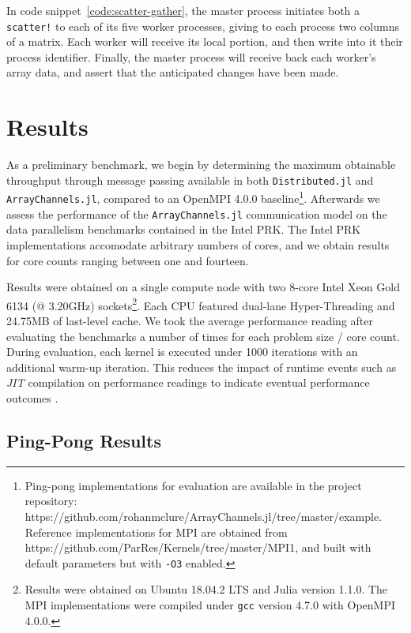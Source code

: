 \documentclass{juliacon}
\begin{document}
In code snippet~\ref{code:scatter-gather}, the master process initiates both a \texttt{scatter!} to each of its five worker processes, giving to each process two columns of a matrix. Each worker will receive its local portion, and then write into it their process identifier. Finally, the master process will receive back each worker's array data, and assert that the anticipated changes have been made.


\section{Results}
\label{sec:results}

As a preliminary benchmark, we begin by determining the maximum
obtainable throughput through message passing available in both
\texttt{Distributed.jl} and \texttt{ArrayChannels.jl}, compared to an
OpenMPI 4.0.0 baseline\footnote{Ping-pong implementations for evaluation
	are available in the project repository:
	https://github.com/rohanmclure/ArrayChannels.jl/tree/master/example.
	Reference implementations for MPI are obtained from
	https://github.com/ParRes/Kernels/tree/master/MPI1, and built with
	default parameters but with \texttt{-O3} enabled.}. Afterwards we
assess the performance of the \texttt{ArrayChannels.jl} communication
model on the data parallelism benchmarks contained in the Intel PRK. The
Intel PRK implementations accomodate arbitrary numbers of cores, and we
obtain results for core counts ranging between one and fourteen.

Results were obtained on a single compute node with two 8-core Intel
Xeon Gold 6134 (@ 3.20GHz) sockets\footnote{Results were obtained on
	Ubuntu 18.04.2 LTS and Julia version 1.1.0. The MPI implementations
	were compiled under \texttt{gcc} version 4.7.0 with OpenMPI 4.0.0.}.
Each CPU featured dual-lane Hyper-Threading and 24.75MB of last-level
cache. We took the average performance reading after evaluating the
benchmarks a number of times for each problem size / core count. During
evaluation, each kernel is executed under 1000 iterations with an
additional warm-up iteration. This reduces the impact of runtime events
such as \emph{JIT} compilation on performance readings to indicate
eventual performance outcomes \cite{blackburn, kulkarni}.

\subsection{Ping-Pong Results}
\label{sec:pingpong-results}
\end{document}

